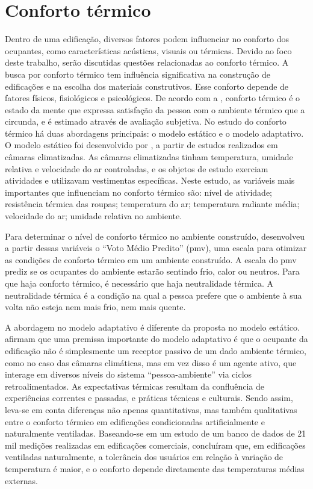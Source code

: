 \section{Conforto térmico}

Dentro de uma edificação, diversos fatores podem influenciar no conforto dos ocupantes, como características acústicas, visuais ou térmicas. Devido ao foco deste trabalho, serão discutidas questões relacionadas ao conforto térmico.
A busca por conforto térmico tem influência significativa na construção de edificações e na escolha dos materiais construtivos. Esse conforto depende de fatores físicos, fisiológicos e psicológicos. De acordo com a , conforto térmico é o estado da mente que expressa satisfação da pessoa com o ambiente térmico que a circunda, e é estimado através de avaliação subjetiva. No estudo do conforto térmico há duas abordagens principais: o modelo estático e o modelo adaptativo. %
O modelo estático foi desenvolvido por , a partir de estudos realizados em câmaras climatizadas. As câmaras climatizadas tinham temperatura, umidade relativa e velocidade do ar controladas, e os objetos de estudo exerciam atividades e utilizavam vestimentas específicas. Neste estudo, as variáveis mais importantes que influenciam no conforto térmico são: nível de atividade; resistência térmica das roupas; temperatura do ar; temperatura radiante média; velocidade do ar; umidade relativa no ambiente.

Para determinar o nível de conforto térmico no ambiente construído,  desenvolveu a partir dessas variáveis o “Voto Médio Predito” (\acrshort{pmv}), uma escala para otimizar as condições de conforto térmico em um ambiente construído. A escala do \acrshort{pmv} prediz se os ocupantes do ambiente estarão sentindo frio, calor ou neutros. Para que haja conforto térmico, é necessário que haja neutralidade térmica. A neutralidade térmica é a condição na qual a pessoa prefere que o ambiente à sua volta não esteja nem mais frio, nem mais quente.

A abordagem no modelo adaptativo é diferente da proposta no modelo estático.  afirmam que uma premissa importante do modelo adaptativo é que o ocupante da edificação não é simplesmente um receptor passivo de um dado ambiente térmico, como no caso das câmaras climáticas, mas em vez disso é um agente ativo, que interage em diversos níveis do sistema “pessoa-ambiente” via ciclos retroalimentados. As expectativas térmicas resultam da confluência de experiências correntes e passadas, e práticas técnicas e culturais. Sendo assim, leva-se em conta diferenças não apenas quantitativas, mas também qualitativas entre o conforto térmico em edificações condicionadas artificialmente e naturalmente ventiladas. Baseando-se em um estudo de um banco de dados de 21 mil medições realizadas em edificações comerciais,  concluíram que, em edificações ventiladas naturalmente, a tolerância dos usuários em relação à variação de temperatura é maior, e o conforto depende diretamente das temperaturas médias externas.

